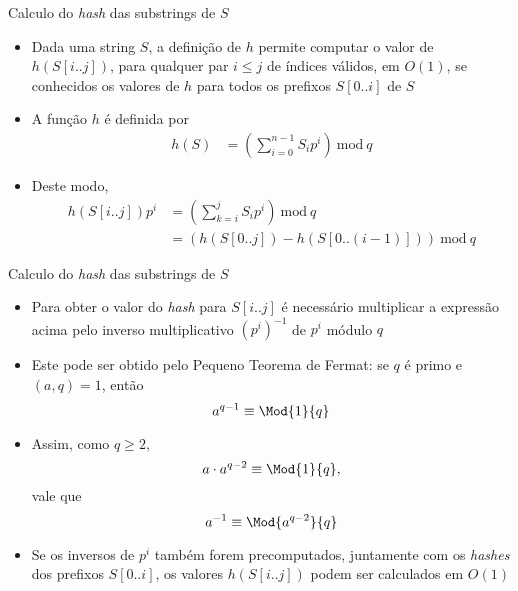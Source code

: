 \begin{frame}[fragile]{Calculo do {\it hash} das substrings de $S$}

    \begin{itemize}
        \item Dada uma string $S$, a definição de $h$ permite computar o valor de $h(S[i..j])$,
            para qualquer par $i\leq j$ de índices válidos, em $O(1)$, se conhecidos os valores
            de $h$ para todos os prefixos $S[0..i]$ de $S$
        \pause

        
        \item A função $h$ é definida por
        \begin{align*}
        h(S) &= \left(\sum_{i=0}^{n - 1} S_ip^i\right)\ \mbox{mod}\ q
        \end{align*}
        \pause


        \item Deste modo,
        \begin{align*}
        h(S[i..j])p^i &= \left(\sum_{k=i}^{j} S_ip^i\right)\ \mbox{mod}\ q \\
        &= \left(h(S[0..j]) - h(S[0..(i - 1)])\right) \ \mbox{mod}\ q
        \end{align*}
    \end{itemize}

\end{frame}

\begin{frame}[fragile]{Calculo do {\it hash} das substrings de $S$}

    \begin{itemize}
        \item Para obter o valor do \textit{hash} para $S[i..j]$ é necessário multiplicar a expressão acima
            pelo inverso multiplicativo $(p^i)^{-1}$ de $p^i$ módulo $q$
        \pause

        \item Este pode ser obtido pelo Pequeno Teorema de Fermat: se $q$ é primo e 
        $(a, q) = 1$, então
        \[
            a^{q-1}\equiv \Mod{1}{q}
        \]
        \pause


        \item Assim, como $q \geq 2$,
        \[
            a\cdot a^{q-2}\equiv \Mod{1}{q},
        \]
        vale que 
        \[
            a^{-1}\equiv \Mod{a^{q-2}}{q}
        \]
        \pause


        \item Se os inversos de $p^i$ também forem precomputados, juntamente com os 
        \textit{hashes} dos prefixos $S[0..i]$, os valores $h(S[i..j])$ podem ser calculados
        em $O(1)$
    \end{itemize}

\end{frame}

